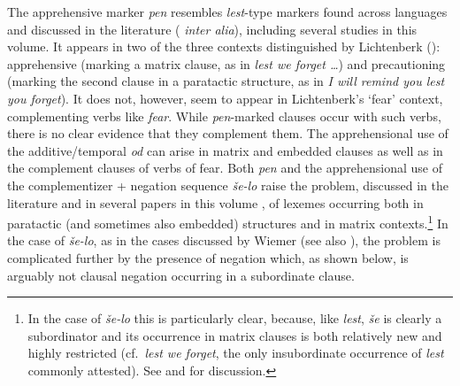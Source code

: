 \documentclass[output=paper,colorlinks,citecolor=brown]{langscibook}
\begin{document}
\largerpage
The apprehensive marker \textit{pen} resembles \textit{lest}-type markers found across languages and discussed in the literature (\citealt{lichtenberk95, angelo-berndt16, puskas17} \textit{inter alia}), including several studies in this volume. It appears in two of the three contexts distinguished by Lichtenberk (\citeyear{lichtenberk95}): apprehensive (marking a matrix clause, as in \textit{lest we forget {\ldots}}) and precautioning (marking the second clause in a paratactic structure, as in \textit{I will remind you lest you forget}). It does not, however, seem to appear in  Lichtenberk's `fear' context, complementing verbs like \textit{fear}. While \textit{pen}-marked clauses occur with such verbs, there is no clear evidence that they complement them. The apprehensional use of the additive/temporal \textit{od} can arise in matrix and embedded clauses as well as in the complement clauses of verbs of fear. Both \textit{pen} and the apprehensional use of the complementizer + negation sequence \textit{še-lo} raise the problem, discussed in the literature and in several papers in this volume \citep{chapters/introduction, chapters/wiemer}, of lexemes occurring both in paratactic (and sometimes also embedded) structures and in matrix contexts.\footnote{In the case of \textit{še-lo} this is particularly clear, because, like \textit{lest}, \textit{še} is clearly a subordinator and its occurrence in matrix clauses is both relatively new and highly restricted (cf.\  \textit{lest we forget}, the only insubordinate occurrence of \textit{lest} commonly attested). See \citet{schwarzwald-shlomo} and \citet{francez-JJL} for discussion.} In the case of \textit{še-lo}, as in the  cases discussed by Wiemer (see also \citealt{baydina}), the problem is complicated further by the presence of negation which, as shown below, is arguably not clausal negation occurring in a subordinate clause.
\end{document}

